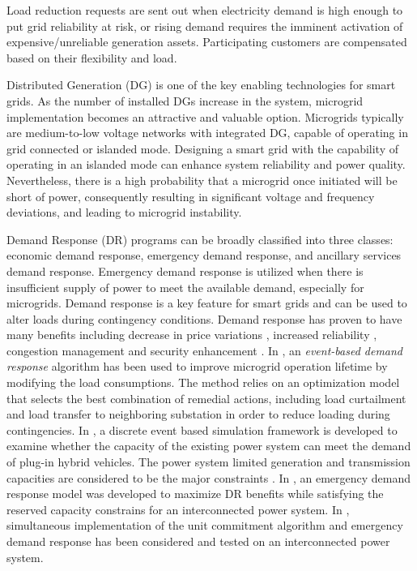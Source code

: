 Load reduction requests are sent out when electricity demand is high enough to put grid reliability at risk, or rising demand requires the imminent activation of expensive/unreliable generation assets. Participating customers are compensated based on their flexibility and load. 
\fi


Distributed Generation  (DG) is one of the key enabling technologies for smart grids. As the number of installed DGs increase in the system, microgrid implementation becomes an attractive and valuable option. Microgrids typically are medium-to-low voltage networks with integrated DG, capable of operating in grid connected or islanded mode.  Designing a smart grid with the capability of operating in an islanded mode can enhance system reliability and power quality. Nevertheless, there is a high probability that a microgrid once initiated will be short of power, consequently resulting in significant voltage and frequency deviations, and leading to microgrid instability. 

Demand Response (DR) programs can be broadly classified into three classes: economic demand response, emergency demand response, and ancillary services demand response. Emergency demand response \cite{Ref6} is utilized when there is insufficient supply of power to meet the available demand, especially for microgrids. Demand response is a key feature for smart grids and can be used to alter loads during contingency conditions.  Demand response has proven to have many benefits including decrease in price variations \cite{Ref1}, increased reliability \cite{Ref2}, congestion management \cite{Ref3} and security enhancement \cite{Ref4}. In \cite{Ref5}, an {\em event-based demand response} algorithm has been used to improve microgrid operation lifetime by modifying the load consumptions. The method relies on an optimization model that selects the best combination of remedial actions, including load curtailment and load transfer to neighboring substation in order to reduce loading during contingencies. In \cite{Ref7}, a discrete event based simulation framework is developed to examine whether the capacity of the existing power system can meet the demand of plug-in hybrid vehicles. The power system limited generation and transmission capacities are considered to be the major constraints \cite{Ref7}. In \cite{Ref8}, an emergency demand response model was developed to maximize DR benefits while satisfying the reserved capacity constrains for an interconnected power system. In \cite{Ref9}, simultaneous implementation of the unit commitment algorithm and emergency demand response has been considered and tested on an interconnected power system. 


